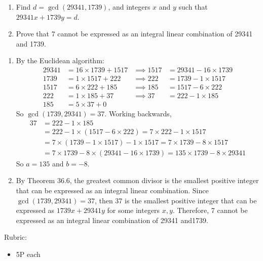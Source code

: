 \documentclass{article}
\theoremstyle{definition}
\begin{document}
\begin{question}
    \begin{enumerate}
        \item Find $d = \gcd(29341,1739)$, and integers $x$ and $y$ such that $29341x + 1739y = d$.
        \item Prove that 7 cannot be expressed as an integral linear combination of 29341 and 1739.
    \end{enumerate}
\end{question}
\begin{solution}
    \begin{enumerate}
        \item By the Euclidean algorithm:
            \begin{align*}
                29341 &= 16 \times 1739 + 1517
                 &\implies 1517 &= 29341 - 16 \times 1739 \\
                 1739 &= 1 \times 1517 + 222
                 &\implies  222 &= 1739 - 1 \times 1517 \\
                 1517 &= 6 \times 222 + 185
                 &\implies  185 &= 1517 - 6 \times 222 \\
                  222 &= 1 \times 185 + 37
                  &\implies  37 &= 222 - 1 \times 185 \\
                  185 &= 5 \times 37 + 0
            \end{align*}
            So $\gcd(1739,29341) = 37$.  Working backwards,
            \begin{align*}
                37 &= 222 - 1 \times 185 \\
                   &= 222 - 1 \times (1517 - 6 \times 222)
                    = 7 \times 222 - 1 \times 1517 \\
                   &= 7 \times (1739 - 1 \times 1517) - 1 \times 1517
                    = 7 \times 1739 - 8 \times 1517 \\
                   &= 7 \times 1739 - 8 \times (29341 - 16 \times 1739)
                    = 135 \times 1739 - 8 \times 29341
            \end{align*}
            So $a=135$ and $b=-8$.
        \item By Theorem 36.6, the greatest common divisor is the smallest positive integer that can be expressed as an integral linear combination. Since $\gcd(1739,29341) = 37$, then 37 is the smallest positive integer that can be expressed as $1739x + 29341y$ for some integers $x, y$. Therefore, 7 cannot be expressed as an integral linear combination of 29341 and1739.
    \end{enumerate}

{\color{red} Rubric:
\begin{itemize}
\item 5P each
\end{itemize}}
\end{solution}
\end{document}
